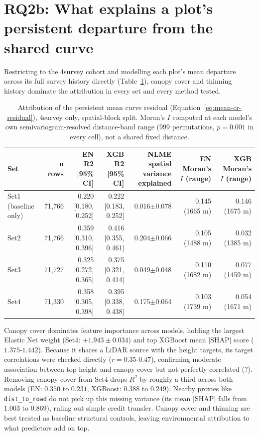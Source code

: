 


\section{RQ2b: What explains a plot's persistent departure from the shared curve}

Restricting to the 4survey cohort and modelling each plot's mean departure across its
full survey history directly (Table~\ref{tab:results-rq2b}), canopy cover and thinning
history dominate the attribution in every set and every method tested.

\begin{table}[!htbp]
\centering
\scriptsize
\setlength{\tabcolsep}{4pt}
\renewcommand{\arraystretch}{1.2}
\begin{tabular}{lrrrrrr}
\toprule
Set & n rows & EN R2 [95\% CI] & XGB R2 [95\% CI] & NLME spatial variance explained & EN Moran's $I$ (range) & XGB Moran's $I$ (range) \\
\midrule
Set1 (baseline only) & 71{,}766 & 0.220 [0.180, 0.252] & 0.222 [0.183, 0.252] & 0.016$\pm$0.078 & 0.145 (1665 m) & 0.146 (1675 m) \\
Set2 & 71{,}766 & 0.359 [0.310, 0.396] & 0.416 [0.355, 0.461] & 0.204$\pm$0.066 & 0.105 (1488 m) & 0.032 (1385 m) \\
Set3 & 71{,}727 & 0.325 [0.272, 0.365] & 0.375 [0.321, 0.414] & 0.049$\pm$0.048 & 0.110 (1682 m) & 0.077 (1459 m) \\
Set4 & 71{,}330 & 0.358 [0.305, 0.398] & 0.395 [0.338, 0.438] & 0.175$\pm$0.064 & 0.103 (1739 m) & 0.054 (1671 m) \\
\bottomrule
\end{tabular}
\caption{Attribution of the persistent mean curve residual (Equation~\ref{eq:mean-cr-residual}),
4survey only, spatial-block split. Moran's $I$ computed at each model's own semivariogram-resolved
distance-band range (999 permutations, $p=0.001$ in every cell), not a shared fixed distance.}
\label{tab:results-rq2b}
\end{table}

Canopy cover dominates feature importance across models, holding the largest Elastic Net weight (Set4: $+1.943 \pm 0.034$) and top XGBoost mean $\vert{}\text{SHAP}\vert{}$ score ($1.375\text{-}1.442$). Because it shares a LiDAR source with the height targets, its target correlations were checked directly ($r = 0.35\text{-}0.47$), confirming moderate association between top height and canopy cover but not perfectly correlated (?). Removing canopy cover from Set4 drops $R^2$ by roughly a third across both models (EN: $0.350$ to $0.231$, XGBoost: $0.388$ to $0.249$). Nearby proxies like \texttt{dist\_to\_road} do not pick up this missing variance (its mean $\vert{}\text{SHAP}\vert{}$ falls from $1.003$ to $0.869$), ruling out simple credit transfer. Canopy cover and thinning are best treated as baseline structural controls, leaving environmental attribution to what predictors add on top.

